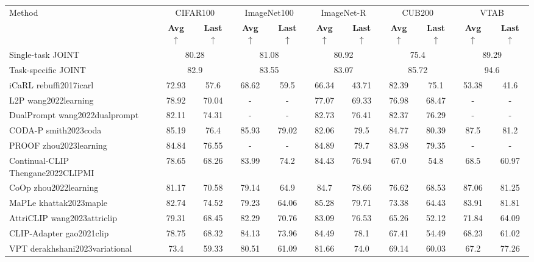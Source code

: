 \documentclass[varwidth=598pt]{standalone}
\begin{document}
\begin{table}
\centering
\begin{adjustbox}{max width=\textwidth}
\begin{tabular}{lcccccccccc}
\hline
\multirow{2}{*}{Method}  & \multicolumn{2}{c}{CIFAR100} & \multicolumn{2}{c}{ImageNet100} & \multicolumn{2}{c}{ImageNet-R} & \multicolumn{2}{c}{CUB200} & \multicolumn{2}{c}{VTAB}\\ 
&  \textbf{Avg} $\uparrow$ & \textbf{Last} $\uparrow$ & \textbf{Avg} $\uparrow$ & \textbf{Last} $\uparrow$ & \textbf{Avg} $\uparrow$ & \textbf{Last} $\uparrow$  & \textbf{Avg} $\uparrow$ & \textbf{Last} $\uparrow$ & \textbf{Avg} $\uparrow$ & \textbf{Last} $\uparrow$ \\
\midrule
Single-task JOINT  & \multicolumn{2}{c}{80.28} & \multicolumn{2}{c}{81.08} & \multicolumn{2}{c}{80.92}  &  \multicolumn{2}{c}{75.4} &  \multicolumn{2}{c}{89.29} \\
Task-specific JOINT & \multicolumn{2}{c}{82.9} & \multicolumn{2}{c}{83.55} & \multicolumn{2}{c}{83.07}  &  \multicolumn{2}{c}{85.72} &  \multicolumn{2}{c}{94.6} \\
\midrule
iCaRL rebuffi2017icarl & 72.93  & 57.6 & 68.62& 59.5 & 66.34 & 43.71  & 82.39& 75.1 & 53.38 & 41.6  \\
\midrule
L2P wang2022learning   & 78.92& 70.04 & - & - & 77.07 & 69.33  & 76.98 & 68.47&  - & -\\
DualPrompt wang2022dualprompt  & 82.11 & 74.31 & - & - & 82.73 & 76.41  &  82.37& 76.29& - & - \\
CODA-P smith2023coda & 85.19 & 76.4 & 85.93 & 79.02 & 82.06 & 79.5 & 84.77 & 80.39 & 87.5 & 81.2 \\
PROOF zhou2023learning  & 84.84 & 76.55 & - & - & 84.89 & 79.7  &  83.98& 79.35& - & -\\
\midrule
Continual-CLIP Thengane2022CLIPMI &  78.65 & 68.26 & 83.99 & 74.2 & 84.43 & 76.94  & 67.0 & 54.8 & 68.5& 60.97   \\
CoOp zhou2022learning & 81.17 & 70.58 & 79.14 & 64.9 & 84.7 & 78.66  & 76.62 & 68.53&  87.06 & 81.25 \\
MaPLe khattak2023maple & 82.74 & 74.52 & 79.23 & 64.06& 85.28 & 79.71 & 73.38 & 64.43 & 83.91 & 81.81 \\
AttriCLIP wang2023attriclip & 79.31 & 68.45 & 82.29 & 70.76 & 83.09 & 76.53  & 65.26  & 52.12 & 71.84 & 64.09 \\
CLIP-Adapter gao2021clip  & 78.75 & 68.32 & 84.13 & 73.96 & 84.49 & 78.1 & 67.41 & 54.49 & 68.23  & 61.02 \\
VPT derakhshani2023variational & 73.4 & 59.33 & 80.51 & 61.09 & 81.66 & 74.0 & 69.14 & 60.03 & 67.2 & 77.26 \\
\midrule


\end{tabular}
\end{adjustbox}
\end{table}
\end{document}
